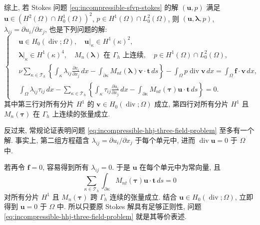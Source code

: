 综上, 若 Stokes 问题 \eqref{eq:incompressible-sfvp-stokes}
的解 $(\mathbf u,p)$ 满足
$\mathbf u\in(H^2(\Omega)\cap H_0^1(\Omega))^2$,
$p\in H^1(\Omega)\cap L_0^2(\Omega)$,
则 $(\mathbf u,\boldsymbol\lambda,p)$,
$\lambda_{ij}=\partial u_i/\partial x_j$, 也是下列问题的解:
\begin{equation}\label{eq:incompressible-hhj-three-field-problem}
\left\{
\begin{aligned}
&\mathbf u\in H_0(\operatorname{div};\Omega),
\quad\mathbf u|_\kappa\in H^1(\kappa)^2,\\
&\boldsymbol\lambda|_\kappa\in H^1(\kappa)^4,
\quad M_n(\boldsymbol\lambda)\text{ 在 }\Gamma_h\text{ 上连续},
\quad p\in H^1(\Omega)\cap L_0^2(\Omega),\\
&\nu\sum_{\kappa\in\mathcal T_h}
\left\{\int_\kappa\lambda_{ij}\frac{\partial v_i}{\partial x_j}\,dx
-\int_{\partial\kappa}M_{nt}(\boldsymbol\lambda)
\mathbf v\cdot\mathbf t\,ds\right\}
-\int_\Omega p\operatorname{div}\mathbf v\,dx
=\int_\Omega\mathbf f\cdot\mathbf v\,dx,\\
&\int_\Omega\lambda_{ij}\tau_{ij}\,dx
-\sum_{\kappa\in\mathcal T_h}
\left\{\int_\kappa\tau_{ij}\frac{\partial u_i}{\partial x_j}\,dx
-\int_{\partial\kappa}M_{nt}(\boldsymbol\tau)
\mathbf u\cdot\mathbf t\,ds\right\}=0.
\end{aligned}
\right.
\end{equation}
其中第三行对所有分片 $H^1$ 的
$\mathbf v\in H_0(\operatorname{div};\Omega)$ 成立,
第四行对所有分片 $H^1$ 且 $M_n(\boldsymbol\tau)$
在 $\Gamma_h$ 上连续的张量成立.

反过来, 常规论证表明问题
\eqref{eq:incompressible-hhj-three-field-problem}
至多有一个解. 事实上, 第二组方程蕴含
$\lambda_{ij}=\partial u_i/\partial x_j$
于每个单元中, 进而 $\operatorname{div}\mathbf u=0$ 于 $\Omega$ 中.

若再令 $\mathbf f=0$, 容易得到所有 $\lambda_{ij}=0$.
于是 $\mathbf u$ 在每个单元中为常向量, 且
\[
\sum_{\kappa\in\mathcal T_h}
\int_{\partial\kappa}M_{nt}(\boldsymbol\tau)
\mathbf u\cdot\mathbf t\,ds=0
\]
对所有分片 $H^1$ 且 $M_n(\boldsymbol\tau)$
跨 $\Gamma_h$ 连续的张量成立.
结合 $\mathbf u\in H_0(\operatorname{div};\Omega)$,
立即得到 $\mathbf u=0$ 于 $\Omega$ 中.
所以只要原 Stokes 解具有足够正则性,
问题 \eqref{eq:incompressible-hhj-three-field-problem}
就是其等价表述.

